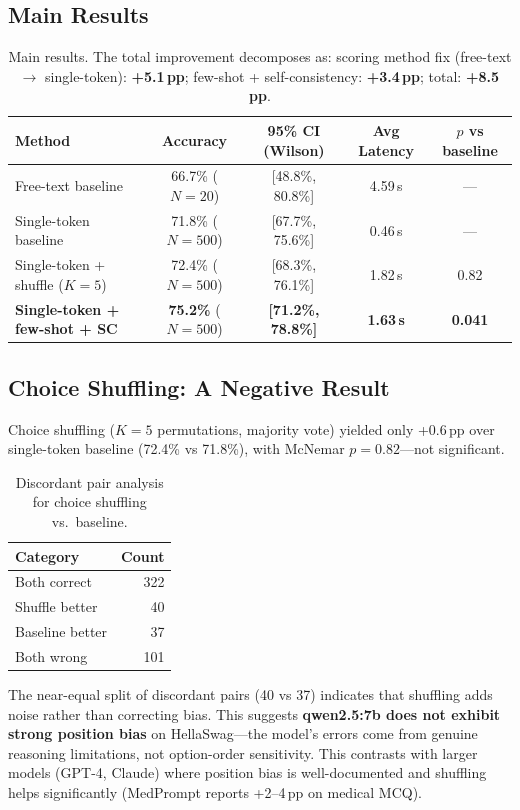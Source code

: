 \documentclass[11pt]{article}
\begin{document}
\subsection{Main Results}

\begin{table}[h]
\centering
\begin{tabular}{@{}lcccc@{}}
\toprule
Method & Accuracy & 95\% CI (Wilson) & Avg Latency & $p$ vs baseline \\
\midrule
Free-text baseline & 66.7\% ($N{=}20$) & [48.8\%, 80.8\%] & 4.59\,s & --- \\
Single-token baseline & 71.8\% ($N{=}500$) & [67.7\%, 75.6\%] & 0.46\,s & --- \\
Single-token + shuffle ($K{=}5$) & 72.4\% ($N{=}500$) & [68.3\%, 76.1\%] & 1.82\,s & 0.82 \\
\textbf{Single-token + few-shot + SC} & \textbf{75.2\%} ($N{=}500$) & \textbf{[71.2\%, 78.8\%]} & \textbf{1.63\,s} & \textbf{0.041} \\
\bottomrule
\end{tabular}
\caption{Main results. The total improvement decomposes as: scoring method fix (free-text $\to$ single-token): \textbf{+5.1\,pp}; few-shot + self-consistency: \textbf{+3.4\,pp}; total: \textbf{+8.5\,pp}.}
\label{tab:main}
\end{table}

\subsection{Choice Shuffling: A Negative Result}

Choice shuffling ($K{=}5$ permutations, majority vote) yielded only +0.6\,pp over single-token baseline (72.4\% vs 71.8\%), with McNemar $p{=}0.82$---not significant.

\begin{table}[h]
\centering
\begin{tabular}{@{}lr@{}}
\toprule
Category & Count \\
\midrule
Both correct & 322 \\
Shuffle better & 40 \\
Baseline better & 37 \\
Both wrong & 101 \\
\bottomrule
\end{tabular}
\caption{Discordant pair analysis for choice shuffling vs.\ baseline.}
\label{tab:shuffle}
\end{table}

The near-equal split of discordant pairs (40 vs 37) indicates that shuffling adds noise rather than correcting bias. This suggests \textbf{qwen2.5:7b does not exhibit strong position bias} on HellaSwag---the model's errors come from genuine reasoning limitations, not option-order sensitivity. This contrasts with larger models (GPT-4, Claude) where position bias is well-documented and shuffling helps significantly (MedPrompt reports +2--4\,pp on medical MCQ).
\end{document}
